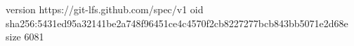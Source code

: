 version https://git-lfs.github.com/spec/v1
oid sha256:5431ed95a32141be2a748f96451ce4c4570f2cb8227277bcb843bb5071e2d68e
size 6081
